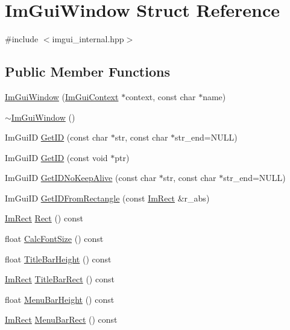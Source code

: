 \hypertarget{struct_im_gui_window}{}\section{Im\+Gui\+Window Struct Reference}
\label{struct_im_gui_window}


{\ttfamily \#include $<$imgui\+\_\+internal.\+hpp$>$}

\subsection*{Public Member Functions}
\begin{DoxyCompactItemize}
\item 
\hyperlink{struct_im_gui_window_acd2909ae3b7079de81d528327cc11dfd}{Im\+Gui\+Window} (\hyperlink{struct_im_gui_context}{Im\+Gui\+Context} $\ast$context, const char $\ast$name)
\item 
\hyperlink{struct_im_gui_window_a8e81d730c3a39a71e6b6ca4654451c53}{$\sim$\+Im\+Gui\+Window} ()
\item 
Im\+Gui\+ID \hyperlink{struct_im_gui_window_a66400a63bc0b54d7d29e08d1b1b1a42b}{Get\+ID} (const char $\ast$str, const char $\ast$str\+\_\+end=N\+U\+LL)
\item 
Im\+Gui\+ID \hyperlink{struct_im_gui_window_aae21dffb343cabca9414499b827912a8}{Get\+ID} (const void $\ast$ptr)
\item 
Im\+Gui\+ID \hyperlink{struct_im_gui_window_adc0a43f74a0b53a15a4bc4fea05524fe}{Get\+I\+D\+No\+Keep\+Alive} (const char $\ast$str, const char $\ast$str\+\_\+end=N\+U\+LL)
\item 
Im\+Gui\+ID \hyperlink{struct_im_gui_window_a44931b6e73248930490d2c89377a8233}{Get\+I\+D\+From\+Rectangle} (const \hyperlink{struct_im_rect}{Im\+Rect} \&r\+\_\+abs)
\item 
\hyperlink{struct_im_rect}{Im\+Rect} \hyperlink{struct_im_gui_window_a147da28bf5d167cbe0a363c4a578dea1}{Rect} () const
\item 
float \hyperlink{struct_im_gui_window_a6881ed65e208fb6e015d3ae6bccfc794}{Calc\+Font\+Size} () const
\item 
float \hyperlink{struct_im_gui_window_ad1580cc8b5bdf981c6ed2eb22ecd7dbb}{Title\+Bar\+Height} () const
\item 
\hyperlink{struct_im_rect}{Im\+Rect} \hyperlink{struct_im_gui_window_a06884e1bc80e460e51e1626b5b976196}{Title\+Bar\+Rect} () const
\item 
float \hyperlink{struct_im_gui_window_acfb8bdad2e3ea6102589813ae32d0364}{Menu\+Bar\+Height} () const
\item 
\hyperlink{struct_im_rect}{Im\+Rect} \hyperlink{struct_im_gui_window_a59df76c1445aaaf0b43456c83c1a88e5}{Menu\+Bar\+Rect} () const
\end{DoxyCompactItemize}
